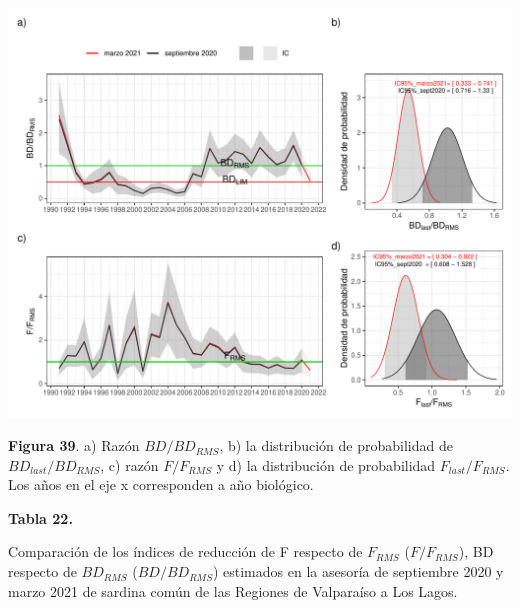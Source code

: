 \documentclass[
  spanish,
]{article}
\begin{document}
\begin{center}\includegraphics{FigurasInforme_Marzo/F39_indicadoresStock-1} \end{center}

\vspace{-0.3cm}
\small

\textbf{Figura 39}. a) Razón \(BD/BD_{RMS}\), b) la distribución de
probabilidad de \(BD_{last}/BD_{RMS}\), c) razón \(F/F_{RMS}\) y d) la
distribución de probabilidad \(F_{last}/F_{RMS}\). Los años en el eje x
corresponden a año biológico. \vspace{0.1cm} \normalsize

\pagebreak

\small
\begin{center} 
\textbf{Tabla 22.}
\end{center}
\begin{center} 
\vspace{-0.2cm} Comparación de los índices de reducción de F respecto de $F_{RMS}$ ($F/F_{RMS}$), BD respecto de $BD_{RMS}$ ($BD/BD_{RMS}$) estimados en la asesoría de septiembre 2020 y marzo 2021 de sardina común de las Regiones de Valparaíso a Los Lagos.
\end{center}
\vspace{-0.2cm}
\end{document}
